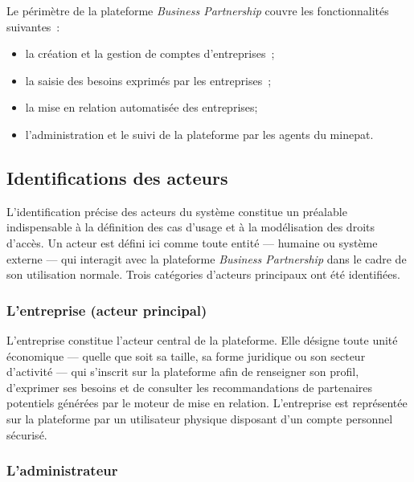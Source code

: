 \documentclass[12pt, a4paper, oneside]{report}
\begin{document}
	Le périmètre de la plateforme \textit{Business Partnership} couvre
	les fonctionnalités suivantes~:
	
	\begin{itemize}
		\item la création et la gestion de comptes d'entreprises~;
		\item la saisie des besoins exprimés par
		les entreprises~;
		\item la mise en relation automatisée des entreprises;
		\item l'administration et le suivi de la plateforme par les
		agents du \gls{minepat}.
	\end{itemize}
	
	
	\subsection{Identifications des acteurs}
	L'identification précise des acteurs du système constitue un
	préalable indispensable à la définition des cas d'usage et à la
	modélisation des droits d'accès. Un acteur est défini ici comme
	toute entité --- humaine ou système externe --- qui interagit
	avec la plateforme \textit{Business Partnership} dans le cadre
	de son utilisation normale. Trois catégories d'acteurs principaux
	ont été identifiées.
	
	
	\subsubsection{L'entreprise (acteur principal)}
	
	L'entreprise constitue l'acteur central de la plateforme. Elle
	désigne toute unité économique --- quelle que soit sa taille,
	sa forme juridique ou son secteur d'activité --- qui s'inscrit
	sur la plateforme afin de renseigner son profil, d'exprimer
	ses besoins et de consulter les recommandations de partenaires
	potentiels générées par le moteur de mise en relation. L'entreprise
	est représentée sur la plateforme par un  utilisateur
	physique disposant d'un compte personnel sécurisé.
	
	\subsubsection{L'administrateur}
	
\end{document}
